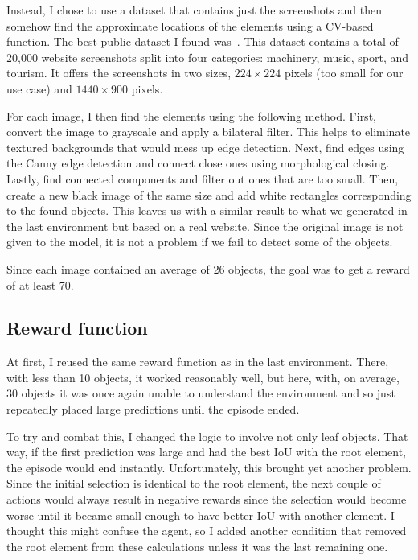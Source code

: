\documentclass[
  digital,     %
  oneside,     %
  nosansbold,  %
  nocolorbold, %
  lof,         %
  lot,         %
]{fithesis4}
\begin{document}
Instead, I chose to use a dataset that contains just the screenshots and then somehow find the approximate locations of the elements using a CV-based function. The best public dataset I found was~\cite{aydos2020}. This dataset contains a total of 20,000 website screenshots split into four categories: machinery, music, sport, and tourism. It offers the screenshots in two sizes, $224\times224$ pixels (too small for our use case) and $1440\times900$ pixels.

For each image, I then find the elements using the following method. First, convert the image to grayscale and apply a bilateral filter. This helps to eliminate textured backgrounds that would mess up edge detection. Next, find edges using the Canny edge detection and connect close ones using morphological closing. Lastly, find connected components and filter out ones that are too small. Then, create a new black image of the same size and add white rectangles corresponding to the found objects. This leaves us with a similar result to what we generated in the last environment but based on a real website. Since the original image is not given to the model, it is not a problem if we fail to detect some of the objects.

Since each image contained an average of 26 objects, the goal was to get a reward of at least 70.

\subsection{Reward function}

At first, I reused the same reward function as in the last environment. There, with less than 10 objects, it worked reasonably well, but here, with, on average, 30 objects it was once again unable to understand the environment and so just repeatedly placed large predictions until the episode ended.

To try and combat this, I changed the logic to involve not only leaf objects. That way, if the first prediction was large and had the best IoU with the root element, the episode would end instantly. Unfortunately, this brought yet another problem. Since the initial selection is identical to the root element, the next couple of actions would always result in negative rewards since the selection would become worse until it became small enough to have better IoU with another element. I thought this might confuse the agent, so I added another condition that removed the root element from these calculations unless it was the last remaining one.
\end{document}

